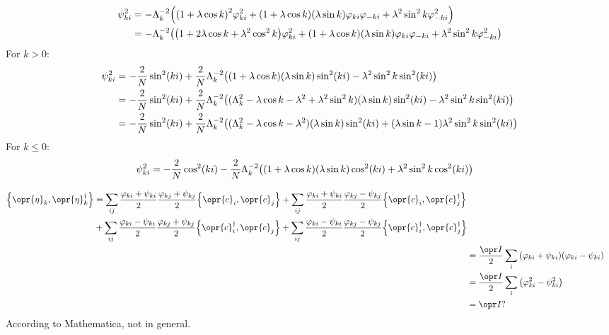 \documentclass[../thesis.tex]{subfiles}
\begin{document}
\begin{align}
  \psi_{ki}^2
  &= -\Lambda_k^{-2} \qty(%
  {(1 + \lambda\cos k)}^2\varphi_{ki}^2
  + (1 + \lambda\cos k)(\lambda\sin k)\varphi_{ki}\varphi_{-ki}
  + \lambda^2\sin^2 k\varphi_{-ki}^2
  ) \\
  &= -\Lambda_k^{-2} \qty(%
  \qty(1 + 2\lambda\cos k + \lambda^2\cos^2 k)\varphi_{ki}^2
  + (1 + \lambda\cos k)(\lambda\sin k)\varphi_{ki}\varphi_{-ki}
  + \lambda^2\sin^2 k\varphi_{-ki}^2
  )
\end{align}
For $k > 0$:
\begin{align}
  \psi_{ki}^2
  &= -\frac{2}{N}\sin^2(ki)
  + \frac{2}{N}\Lambda_k^{-2}\qty(
  (1 + \lambda\cos k)(\lambda\sin k)\sin^2(ki)
  - \lambda^2\sin^2 k\sin^2(ki)
  ) \\
  &= -\frac{2}{N}\sin^2(ki)
  + \frac{2}{N}\Lambda_k^{-2}\qty(
  (\Lambda_k^2 - \lambda\cos k - \lambda^2 + \lambda^2\sin^2 k)(\lambda\sin k)\sin^2(ki)
  - \lambda^2\sin^2 k\sin^2(ki)
  ) \\
  &= -\frac{2}{N}\sin^2(ki)
  + \frac{2}{N}\Lambda_k^{-2}\qty(
  (\Lambda_k^2 - \lambda\cos k - \lambda^2)(\lambda\sin k)\sin^2(ki)
  + (\lambda\sin k - 1)\lambda^2\sin^2 k\sin^2(ki)
  ) \\
\end{align}
For $k \leq 0$:
\begin{align}
  \psi_{ki}^2
  &= -\frac{2}{N}\cos^2(ki)
  - \frac{2}{N}\Lambda_k^{-2}\qty(
  (1 + \lambda\cos k)(\lambda\sin k)\cos^2(ki)
  + \lambda^2\sin^2 k\cos^2(ki)
  )
\end{align}

\begin{align}
  \begin{split}
    \acomm{\opr{\eta}_k}{\opr{\eta}_k^\dag}
  &=
  \sum_{ij}
  \frac{\varphi_{ki} + \psi_{ki}}{2}
  \frac{\varphi_{kj} + \psi_{kj}}{2}
  \acomm{\opr{c}_i}{\opr{c}_j}
  +
  \sum_{ij}
  \frac{\varphi_{ki} + \psi_{ki}}{2}
  \frac{\varphi_{kj} - \psi_{kj}}{2}
  \acomm{\opr{c}_i}{\opr{c}_j^\dag} \\
  &+
  \sum_{ij}
  \frac{\varphi_{ki} - \psi_{ki}}{2}
  \frac{\varphi_{kj} + \psi_{kj}}{2}
  \acomm{\opr{c}_i^\dag}{\opr{c}_j}
  +
  \sum_{ij}
  \frac{\varphi_{ki} - \psi_{ki}}{2}
  \frac{\varphi_{kj} - \psi_{kj}}{2}
  \acomm{\opr{c}_i^\dag}{\opr{c}_j^\dag}
  \end{split} \\
  &= \frac{\idopr}{2} \sum_{i}
  \qty(\varphi_{ki} + \psi_{ki})\qty(\varphi_{ki} - \psi_{ki})
  \\
  &= \frac{\idopr}{2} \sum_{i}
  \qty(\varphi_{ki}^2 - \psi_{ki}^2)
  \\
  &= \idopr?
\end{align}
According to Mathematica, not in general.
\end{document}
